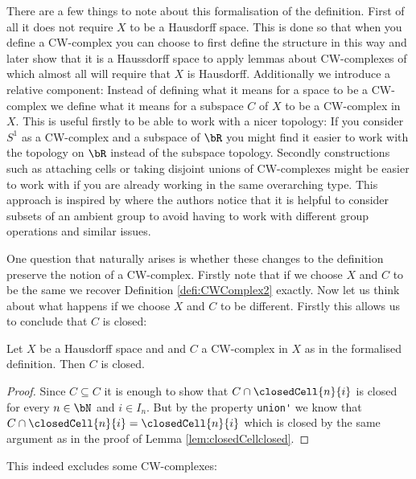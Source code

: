 There are a few things to note about this formalisation of the definition.
First of all it does not require $X$ to be a Hausdorff space.
This is done so that when you define a CW-complex you can choose to first define the structure in this way and later show that it is a Haussdorff space to apply lemmas about CW-complexes of which almost all will require that $X$ is Hausdorff.
Additionally we introduce a relative component:
Instead of defining what it means for a space to be a CW-complex we define what it means for a subspace $C$ of $X$ to be a CW-complex in $X$.
This is useful firstly to be able to work with a nicer topology:
If you consider $S^1$ as a CW-complex and a subspace of $\bR$ you might find it easier to work with the topology on $\bR$ instead of the subspace topology.
Secondly constructions such as attaching cells or taking disjoint unions of CW-complexes might be easier to work with if you are already working in the same overarching type.
This approach is inspired by \cite{Gonthier2013} where the authors notice that it is helpful to consider subsets of an ambient group to avoid having to work with different group operations and similar issues.

One question that naturally arises is whether these changes to the definition preserve the notion of a CW-complex.
Firstly note that if we choose $X$ and $C$ to be the same we recover Definition \ref{defi:CWComplex2} exactly.
Now let us think about what happens if we choose $X$ and $C$ to be different.
Firstly this allows us to conclude that $C$ is closed:

\begin{lem} \label{lem:Cclosed}
  Let $X$ be a Hausdorff space and and $C$ a CW-complex in $X$ as in the formalised definition.
  Then $C$ is closed.
\end{lem}
\begin{proof}
  Since $C \subseteq C$ it is enough to show that $C \cap \closedCell{n}{i}$ is closed for every $n \in \bN$ and $i \in I_n$.
  But by the property \lstinline{union'} we know that $C \cap \closedCell{n}{i} = \closedCell{n}{i}$ which is closed by the same argument as in the proof of Lemma \ref{lem:closedCellclosed}.
\end{proof}

This indeed excludes some CW-complexes:

